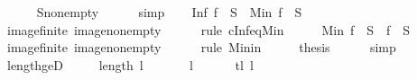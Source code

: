 \begin{isabellebody}
\ \ \ \ \isamarkupfalse%
\ S{\isacharunderscore}{\kern0pt}non{\isacharunderscore}{\kern0pt}empty\isanewline
\ \ \ \ \isamarkupfalse%
\ simp\isanewline
\isanewline
\ \ \isamarkupfalse%
\ {\isachardoublequoteopen}Inf\ {\isacharparenleft}{\kern0pt}f\ {\isacharbackquote}{\kern0pt}\ S{\isacharparenright}{\kern0pt}\ {\isacharequal}{\kern0pt}\ Min\ {\isacharparenleft}{\kern0pt}f\ {\isacharbackquote}{\kern0pt}\ S{\isacharparenright}{\kern0pt}{\isachardoublequoteclose}\isanewline
\ \ \ \ \isamarkupfalse%
\ image{\isacharunderscore}{\kern0pt}finite\ image{\isacharunderscore}{\kern0pt}non{\isacharunderscore}{\kern0pt}empty\isanewline
\ \ \ \ \isamarkupfalse%
\ {\isacharparenleft}{\kern0pt}rule\ cInf{\isacharunderscore}{\kern0pt}eq{\isacharunderscore}{\kern0pt}Min{\isacharparenright}{\kern0pt}\isanewline
\ \ \isamarkupfalse%
\ \isamarkupfalse%
\ {\isachardoublequoteopen}Min\ {\isacharparenleft}{\kern0pt}f\ {\isacharbackquote}{\kern0pt}\ S{\isacharparenright}{\kern0pt}\ {\isasymin}\ {\isacharparenleft}{\kern0pt}f\ {\isacharbackquote}{\kern0pt}\ S{\isacharparenright}{\kern0pt}{\isachardoublequoteclose}\isanewline
\ \ \ \ \isamarkupfalse%
\ image{\isacharunderscore}{\kern0pt}finite\ image{\isacharunderscore}{\kern0pt}non{\isacharunderscore}{\kern0pt}empty\isanewline
\ \ \ \ \isamarkupfalse%
\ {\isacharparenleft}{\kern0pt}rule\ Min{\isacharunderscore}{\kern0pt}in{\isacharparenright}{\kern0pt}\isanewline
\ \ \isamarkupfalse%
\ \isamarkupfalse%
\ {\isacharquery}{\kern0pt}thesis\isanewline
\ \ \ \ \isamarkupfalse%
\ simp\isanewline
{}\isamarkupfalse%
%
\endisatagproof
{\isafoldproof}%
%
\isadelimproof
%
\endisadelimproof
%
\isadelimdocument
%
\endisadelimdocument
%
\isatagdocument
%
\isamarkuptrue%
%
\isamarkuptrue%
%
\endisatagdocument
{\isafolddocument}%
%
\isadelimdocument
%
\endisadelimdocument
{}\isamarkupfalse%
\ length{\isacharunderscore}{\kern0pt}ge{\isacharunderscore}{\kern0pt}{}D{\isacharcolon}{\kern0pt}\isanewline
\ \ \ {\isachardoublequoteopen}{}\ {\isasymle}\ length\ l{\isachardoublequoteclose}\isanewline
\ \ \isanewline
\ \ \ \ {\isachardoublequoteopen}l\ {\isasymnoteq}\ {\isacharbrackleft}{\kern0pt}{\isacharbrackright}{\kern0pt}{\isachardoublequoteclose}\isanewline
\ \ \ \ {\isachardoublequoteopen}tl\ l\ {\isasymnoteq}\ {\isacharbrackleft}{\kern0pt}{\isacharbrackright}{\kern0pt}{\isachardoublequoteclose}\isanewline

\end{isabellebody}
